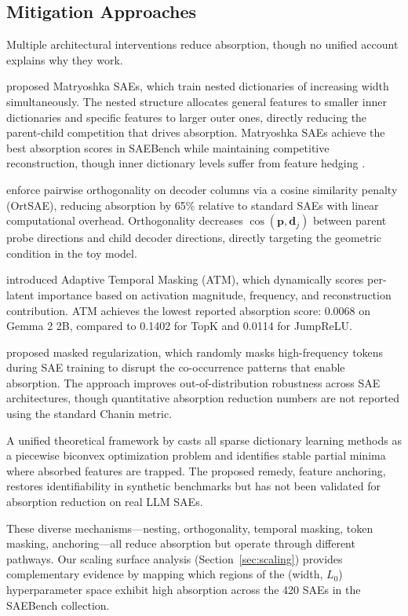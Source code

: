 \documentclass{article}
\begin{document}
\subsection{Mitigation Approaches}

Multiple architectural interventions reduce absorption, though no unified account explains why they work.

\citet{bussmann2025matryoshka} proposed Matryoshka SAEs, which train nested dictionaries of increasing width simultaneously.
The nested structure allocates general features to smaller inner dictionaries and specific features to larger outer ones, directly reducing the parent-child competition that drives absorption.
Matryoshka SAEs achieve the best absorption scores in SAEBench while maintaining competitive reconstruction, though inner dictionary levels suffer from feature hedging \citep{chanin2025hedging}.

\citet{korznikov2025ortsae} enforce pairwise orthogonality on decoder columns via a cosine similarity penalty (OrtSAE), reducing absorption by 65\% relative to standard SAEs with linear computational overhead.
Orthogonality decreases $\cos(\mathbf{p}, \mathbf{d}_j)$ between parent probe directions and child decoder directions, directly targeting the geometric condition in the \citet{chanin2024absorption} toy model.

\citet{li2025atm} introduced Adaptive Temporal Masking (ATM), which dynamically scores per-latent importance based on activation magnitude, frequency, and reconstruction contribution.
ATM achieves the lowest reported absorption score: 0.0068 on Gemma 2 2B, compared to 0.1402 for TopK and 0.0114 for JumpReLU.

\citet{narayanaswamy2026masked} proposed masked regularization, which randomly masks high-frequency tokens during SAE training to disrupt the co-occurrence patterns that enable absorption.
The approach improves out-of-distribution robustness across SAE architectures, though quantitative absorption reduction numbers are not reported using the standard Chanin metric.

A unified theoretical framework by \citet{wright2025framework} casts all sparse dictionary learning methods as a piecewise biconvex optimization problem and identifies stable partial minima where absorbed features are trapped.
The proposed remedy, feature anchoring, restores identifiability in synthetic benchmarks but has not been validated for absorption reduction on real LLM SAEs.

These diverse mechanisms---nesting, orthogonality, temporal masking, token masking, anchoring---all reduce absorption but operate through different pathways.
Our scaling surface analysis (Section~\ref{sec:scaling}) provides complementary evidence by mapping which regions of the (width, $L_0$) hyperparameter space exhibit high absorption across the 420 SAEs in the SAEBench collection.
\end{document}

